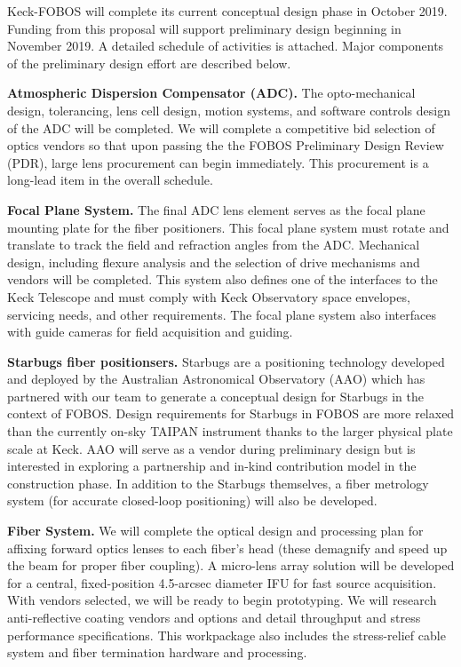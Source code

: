\documentclass[oneside,11pt]{amsart}
\begin{document}
Keck-FOBOS will complete its current conceptual design phase in October 2019.  Funding from this proposal will support preliminary design beginning in November 2019.  A detailed schedule of activities is attached.  Major components of the preliminary design effort are described below.

\noindent \textbf{Atmospheric Dispersion Compensator (ADC).} The opto-mechanical design, tolerancing, lens cell design, motion systems, and software controls design of the ADC will be completed.  We will complete a competitive bid selection of optics vendors so that upon passing the the FOBOS Preliminary Design Review (PDR), large lens procurement can begin immediately.  This procurement is a long-lead item in the overall schedule.

\noindent \textbf{Focal Plane System.} The final ADC lens element serves as the focal plane mounting plate for the fiber positioners.  This focal plane system must rotate and translate to track the field and refraction angles from the ADC.  Mechanical design, including flexure analysis and the selection of drive mechanisms and vendors will be completed.  This system also defines one of the interfaces to the Keck Telescope and must comply with Keck Observatory space envelopes, servicing needs, and other requirements.  The focal plane system also interfaces with guide cameras for field acquisition and guiding.

\noindent \textbf{Starbugs fiber positionsers.} Starbugs are a positioning technology developed and deployed by the
Australian Astronomical Observatory (AAO) which has partnered with our team to generate a conceptual design for
Starbugs in the context of FOBOS.  Design requirements for Starbugs in FOBOS are more relaxed than the currently on-sky
TAIPAN instrument thanks to the larger physical plate scale at Keck.  AAO will serve as a vendor during preliminary
design but is interested in exploring a partnership and in-kind contribution model in the construction phase.  In addition to the Starbugs themselves, a fiber metrology system (for accurate closed-loop positioning) will also be developed.

\noindent \textbf{Fiber System.} We will complete the optical design and processing plan for affixing forward optics
lenses to each fiber's head (these demagnify and speed up the beam for proper fiber coupling).  A micro-lens array
solution will be developed for a central, fixed-position 4.5-arcsec diameter IFU for fast source acquisition.  With vendors selected, we will be ready to begin prototyping.  We will
research anti-reflective coating vendors and options and detail throughput and stress performance specifications.  This
workpackage also includes the stress-relief cable system and fiber termination hardware and processing.
\end{document}
